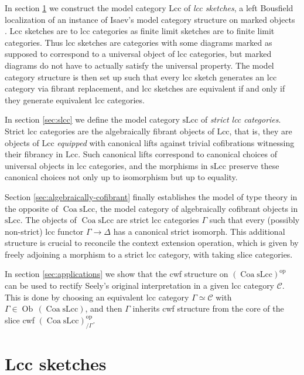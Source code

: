 \documentclass[a4paper]{article}
\theoremstyle{remark}
\theoremstyle{definition}
\begin{document}
In section \ref{sec:lcc-sketches} we construct the model category $\mathrm{Lcc}$ of \emph{lcc sketches}, a left Bousfield localization of an instance of Isaev's model category structure on marked objects \cite{marked-objects}.
Lcc sketches are to lcc categories as finite limit sketches are to finite limit categories.
Thus lcc sketches are categories with some diagrams marked as supposed to correspond to a universal object of lcc categories, but marked diagrams do not have to actually satisfy the universal property.
The model category structure is then set up such that every lcc sketch generates an lcc category via fibrant replacement, and lcc sketches are equivalent if and only if they generate equivalent lcc categories.

In section \ref{sec:slcc} we define the model category $\mathrm{sLcc}$ of \emph{strict lcc categories}.
Strict lcc categories are the algebraically fibrant objects of $\mathrm{Lcc}$, that is, they are objects of $\mathrm{Lcc}$ \emph{equipped} with canonical lifts against trivial cofibrations witnessing their fibrancy in $\mathrm{Lcc}$.
Such canonical lifts correspond to canonical choices of universal objects in lcc categories, and the morphisms in $\mathrm{sLcc}$ preserve these canonical choices not only up to isomorphism but up to equality.

Section \ref{sec:algebraically-cofibrant} finally establishes the model of type theory in the opposite of $\operatorname{Coa} \mathrm{sLcc}$, the model category of algebraically cofibrant objects in $\mathrm{sLcc}$.
The objects of $\operatorname{Coa} \mathrm{sLcc}$ are strict lcc categories $\Gamma$ such that every (possibly non-strict) lcc functor $\Gamma \rightarrow \Delta$ has a canonical strict isomorph.
This additional structure is crucial to reconcile the context extension operation, which is given by freely adjoining a morphism to a strict lcc category, with taking slice categories.

In section \ref{sec:applications} we show that the cwf structure on $(\operatorname{Coa} \mathrm{sLcc})^\mathrm{op}$ can be used to rectify Seely's original interpretation in a given lcc category $\mathcal{C}$.
This is done by choosing an equivalent lcc category $\Gamma \simeq \mathcal{C}$ with $\Gamma \in \operatorname{Ob} \, (\operatorname{Coa} \mathrm{sLcc})$, and then $\Gamma$ inherits cwf structure from the core of the slice cwf $(\operatorname{Coa} \mathrm{sLcc})^\mathrm{op}_{ / \Gamma}$.

\section{Lcc sketches}
\label{sec:lcc-sketches}
\end{document}

